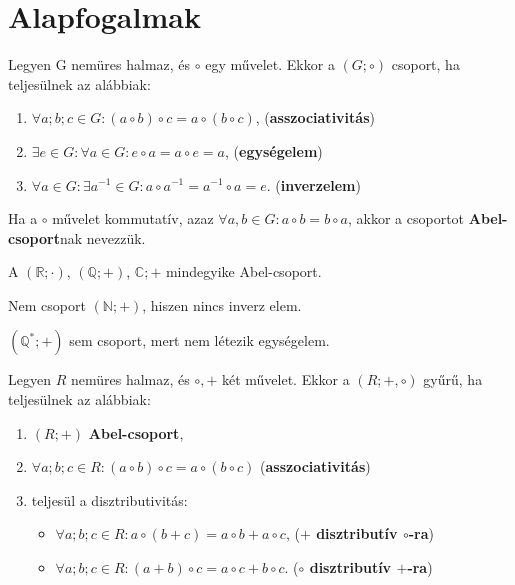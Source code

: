 \clearpage

\section{Alapfogalmak}\label{sec-01-01}

\begin{definition}[Csoport]
  Legyen G nemüres halmaz, és $\circ$ egy művelet. Ekkor a $(G; \circ)$ csoport,
  ha teljesülnek az alábbiak:
  \begin{enumerate}
    \item $\forall a; b; c \in G: (a \circ b) \circ c = a \circ (b \circ c)$,
          \hfill (\textbf{asszociativitás})

    \item $\exists e \in G: \forall a \in G: e \circ a = a \circ e = a$,
          \hfill(\textbf{egységelem})

    \item $\forall a \in G: \exists a^{-1} \in G:
            a \circ a^{-1} = a^{-1} \circ a = e$.
          \hfill (\textbf{inverzelem})
  \end{enumerate}
\end{definition}

\begin{note}
  Ha a $\circ$ művelet kommutatív, azaz $\forall a, b \in G: a \circ b = b \circ
    a$, akkor a csoportot \textbf{Abel-csoport}nak nevezzük.
\end{note}

\begin{example}
  A $(\mathbb R; \cdot)$, $(\mathbb Q; +)$, $\mathbb C; +$ mindegyike
  Abel-csoport.

  Nem csoport $(\mathbb N; +)$, hiszen nincs inverz elem.

  $(\mathbb Q^*; +)$ sem csoport, mert nem létezik egységelem.
\end{example}

\begin{definition}[Gyűrű]
  Legyen $R$ nemüres halmaz, és $\circ, +$ két művelet. Ekkor a $(R; +, \circ)$
  gyűrű, ha teljesülnek az alábbiak:
  \begin{enumerate}
    \item $(R; +)$ \textbf{Abel-csoport},

    \item $\forall a; b; c \in R: (a \circ b) \circ c = a \circ (b \circ c)$
          \hfill (\textbf{asszociativitás})

    \item teljesül a disztributivitás:
          \begin{itemize}
            \item $\forall a; b; c \in R:
                    a \circ (b + c) = a \circ b + a \circ c$,
                  \hfill (\textbf{$+$ disztributív $\circ$-ra})

            \item $\forall a; b; c \in R:
                    (a + b) \circ c = a \circ c + b \circ c$.
                  \hfill (\textbf{$\circ$ disztributív $+$-ra})
          \end{itemize}
  \end{enumerate}
\end{definition}


